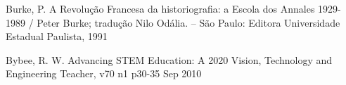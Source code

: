 \documentclass[
12pt,		%
openright,	%
twoside,  %
a4paper,			%
chapter=TITLE,		%
english,			%
french,				%
spanish,			%
brazil				%
]{USPSC-classe/USPSC}
\begin{document}
\begin{flushleft}
\begin{flushleft}
\begin{flushleft}
\begin{flushleft}
\begin{flushleft}
\begin{flushleft}
\begin{flushleft}
\begin{flushleft}
\begin{flushleft}
[BURKE, 1991] Burke, P. A Revolu\c{c}\~ao Francesa da historiografia: a Escola dos Annales 1929-1989 / Peter Burke; tradu\c{c}\~ao Nilo Od\'alia. – S\~ao Paulo: Editora Universidade Estadual Paulista, 1991
\end{flushleft}


\end{flushleft}


\end{flushleft}


\end{flushleft}


\end{flushleft}


\end{flushleft}


\end{flushleft}


\end{flushleft}


\end{flushleft}


\begin{flushleft}
\begin{flushleft}
\begin{flushleft}
\begin{flushleft}
\begin{flushleft}
\begin{flushleft}
\begin{flushleft}
\begin{flushleft}
\begin{flushleft}
[BYBEE, 2010] Bybee, R. W. Advancing STEM Education: A 2020 Vision, Technology and Engineering Teacher, v70 n1 p30-35 Sep 2010
\end{flushleft}


\end{flushleft}


\end{flushleft}


\end{flushleft}


\end{flushleft}


\end{flushleft}


\end{flushleft}


\end{flushleft}


\end{flushleft}
\end{document}
